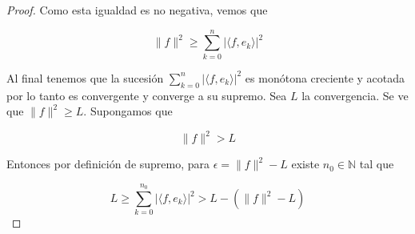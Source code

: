 \begin{proof}
	Como esta igualdad es no negativa, vemos que
	
	\begin{equation}
		\|f\|^2 \geq \sum_{k=0}^{n} |\langle f,e_k \rangle|^2
	\end{equation}
	
	Al final tenemos que la sucesión $\sum_{k=0}^{n} |\langle f,e_k \rangle|^2$ es monótona creciente y acotada por lo tanto es convergente y converge a su supremo. Sea $L$ la convergencia. Se ve que $\|f\|^2 \geq L$. Supongamos que
	
	\begin{equation}
		\|f\|^2 > L
	\end{equation}
	
	Entonces por definición de supremo, para $\epsilon=\|f\|^2-L$ existe $n_0 \in \mathbb{N}$ tal que
	
	\begin{equation}
		L \geq \sum_{k=0}^{n_0} |\langle f,e_k \rangle|^2 > L - (\|f\|^2-L)
	\end{equation}
\end{proof}